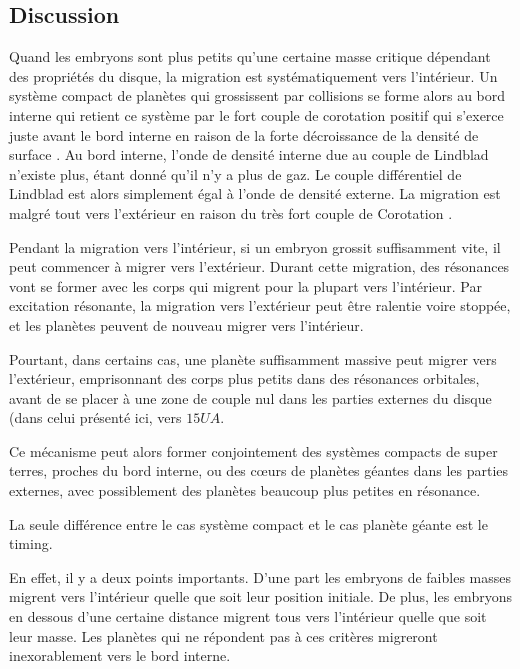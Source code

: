 \subsection{Discussion}
Quand les embryons sont plus petits qu'une certaine masse critique dépendant des propriétés du disque, la migration est systématiquement vers l'intérieur. Un système compact de planètes qui grossissent par collisions se forme alors au bord interne qui retient ce système par le fort couple de corotation positif qui s'exerce juste avant le bord interne en raison de la forte décroissance de la densité de surface \citep{masset2006disk}. Au bord interne, l'onde de densité interne due au couple de Lindblad n'existe plus, étant donné qu'il n'y a plus de gaz. Le couple différentiel de Lindblad est alors simplement égal à l'onde de densité externe. La migration est malgré tout vers l'extérieur en raison du très fort couple de Corotation \citep{masset2006disk}.

Pendant la migration vers l'intérieur, si un embryon grossit suffisamment vite, il peut commencer à migrer vers l'extérieur. Durant cette migration, des résonances vont se former avec les corps qui migrent pour la plupart vers l'intérieur. Par excitation résonante, la migration vers l'extérieur peut être ralentie voire stoppée, et les planètes peuvent de nouveau migrer vers l'intérieur. 

Pourtant, dans certains cas, une planète suffisamment massive peut migrer vers l'extérieur, emprisonnant des corps plus petits dans des résonances orbitales, avant de se placer à une zone de couple nul dans les parties externes du disque (dans celui présenté ici, vers $15\unit{UA}$.

\bigskip

Ce mécanisme peut alors former conjointement des systèmes compacts de super terres, proches du bord interne, ou des cœurs de planètes géantes dans les parties externes, avec possiblement des planètes beaucoup plus petites en résonance. 

La seule différence entre le cas système compact et le cas planète géante est le timing. 

En effet, il y a deux points importants. D'une part les embryons de faibles masses migrent vers l'intérieur quelle que soit leur position initiale. De plus, les embryons en dessous d'une certaine distance migrent tous vers l'intérieur quelle que soit leur masse. Les planètes qui ne répondent pas à ces critères migreront inexorablement vers le bord interne. 


